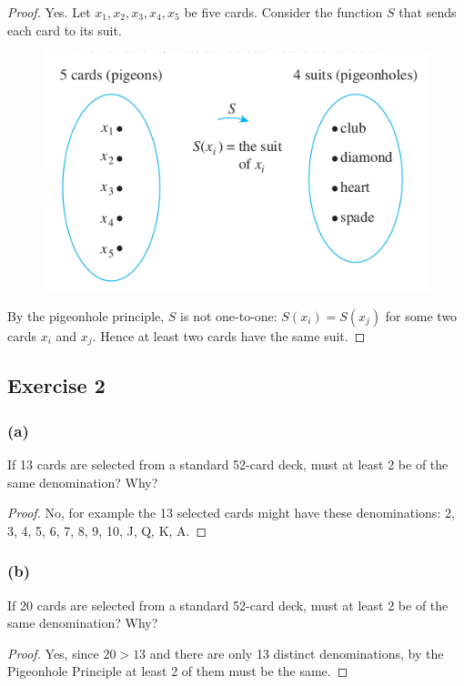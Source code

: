 \documentclass[14pt]{extarticle}
\begin{document}
\begin{proof}
     Yes. Let \(x_1,x_2,x_3,x_4,x_5\) be five cards. Consider the function \(S\) that sends each card to its suit.

     \begin{figure}[ht!]
          \centering
          \includegraphics[scale=0.5]{../images/9.4.1.b.png}
     \end{figure}

     By the pigeonhole principle, \(S\) is not one-to-one: \(S(x_i) = S(x_j)\) for some two cards \(x_i\) and \(x_j\).
     Hence at least two cards have the same suit.
\end{proof}

\subsection{Exercise 2}
\subsubsection{(a)}
If 13 cards are selected from a standard 52-card deck, must at least 2 be of the same denomination? Why?

\begin{proof}
     No, for example the 13 selected cards might have these denominations: 2, 3, 4, 5, 6, 7, 8, 9, 10, J, Q, K, A.
\end{proof}

\subsubsection{(b)}
If 20 cards are selected from a standard 52-card deck, must at least 2 be of the same denomination? Why?

\begin{proof}
     Yes, since \(20 > 13\) and there are only 13 distinct denominations, by the Pigeonhole Principle at least 2 of
     them must be the same.
\end{proof}
\end{document}
